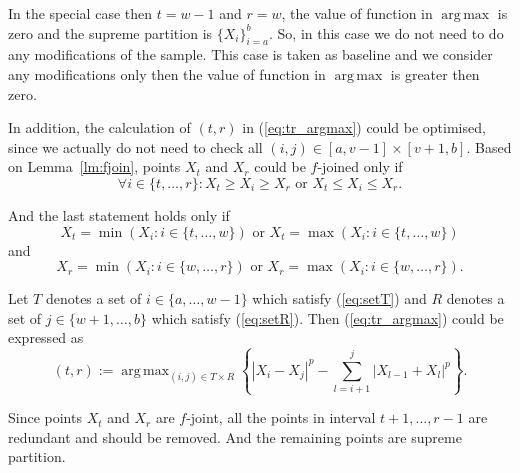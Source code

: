 \documentclass[12pt, a4paper]{article}
\DeclareMathOperator*{\argmax}{arg\,max}
\numberwithin{equation}{section}
\begin{document}
In the special case then $t=w-1$ and $r=w$, the value 
of function in $\argmax$ is zero and the supreme
partition is $\{X_{i}\}_{i=a}^{b}$. So, in this case we do not 
need to do any modifications of the sample. 
This case is taken as baseline and we consider 
any modifications only then the value of function
in $\argmax$ is greater then zero.

In addition, the calculation of $(t, r)$ in (\ref{eq:tr_argmax})
could be optimised, since we actually do not need to check
all $(i,j) \in [a, v-1] \times [v+1, b]$. 
Based on Lemma~\ref{lm:fjoin},
points $X_t$ and $X_r$ could be $f$-joined only if 
\begin{equation}
  \forall i \in \{t,\dots,r\}: X_t \geq X_i \geq X_r \text{ or } 
  X_t \leq X_i \leq X_r.
\end{equation} 
   
And the last statement holds only if 
\begin{equation}\label{eq:setT}
  X_t =  \min ( X_i : i \in \{t, \dots, w\}) 
    \text{ or } X_t =  \max ( X_i : i \in \{t, \dots, w\})
\end{equation}
and
\begin{equation}\label{eq:setR}
  X_r =  \min ( X_i : i \in \{w, \dots, r\}) 
    \text{ or } X_r = \max ( X_i : i \in \{w, \dots, r\}).
\end{equation} 


Let $T$ denotes a set of $i \in \{a,\dots ,w-1\}$ which satisfy 
(\ref{eq:setT}) and $R$ denotes a set of 
$j \in \{w+1,\dots ,b\}$ which satisfy (\ref{eq:setR}).
Then (\ref{eq:tr_argmax}) 
could be expressed as
\begin{equation}
  (t, r) :=  
    \argmax_{(i,j) \in T \times R }  
    \left\{|X_i-X_j|^p - \sum_{l=i+1}^j |X_{l-1} + X_{l}|^p  \right\}.   
\end{equation} 

Since points $X_t$ and $X_r$ are $f$-joint, all the 
points in interval $t+1,\dots, r-1$ are redundant
and should be removed. And the remaining points are supreme partition.
\end{document}
